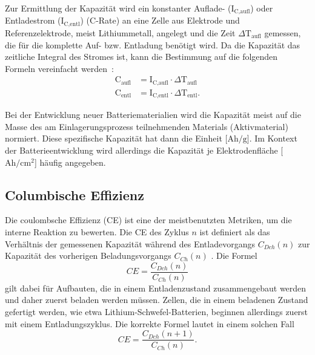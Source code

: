 Zur Ermittlung der Kapazität wird ein konstanter Auflade- ($\text{I}_\text{C,aufl}$) oder Entladestrom ($\text{I}_\text{C,entl}$) (C-Rate) an eine Zelle aus Elektrode und Referenzelektrode, meist Lithiummetall, angelegt und die Zeit $\Delta \text{T}_\text{aufl}$ gemessen, die für die komplette Auf- bzw. Entladung benötigt wird. Da die Kapazität das zeitliche Integral des Stromes ist, kann die Bestimmung auf die folgenden Formeln vereinfacht werden~\cite{Newman2021}:
\begin{align}
	\text{C}_{\text{aufl}} &= \text{I}_\text{C,aufl} \cdot \Delta \text{T}_\text{aufl}\\
	\text{C}_{\text{entl}} &= \text{I}_\text{C,entl} \cdot \Delta \text{T}_\text{entl}.
\end{align}


Bei der Entwicklung neuer Batteriematerialien wird die Kapazität meist auf die Masse des am Einlagerungsprozess teilnehmenden Materials (Aktivmaterial) normiert. Diese spezifische Kapazität hat dann die Einheit [$\si{\A \hour \per \g}$]. Im Kontext der Batterieentwicklung wird allerdings die Kapazität je Elektrodenfläche [$\si{\A \hour \per \cm\squared}$] häufig angegeben.


\subsection{Columbische Effizienz}
Die coulombsche Effizienz (CE) ist eine der meistbenutzten Metriken, um die interne Reaktion zu bewerten. Die CE des Zyklus \( n \) ist definiert als das Verhältnis der gemessenen Kapazität während des Entladevorgangs \( C_{Dch}(n) \) zur Kapazität des vorherigen Beladungsvorgangs \( C_{Ch}(n) \) \cite{Tornheim2020}.
Die Formel
\begin{equation}
CE = \frac{C_{Dch}(n)}{C_{Ch}(n)}
\end{equation}
gilt dabei für Aufbauten, die in einem Entladenzustand zusammengebaut werden und daher zuerst beladen werden müssen. Zellen, die in einem beladenen Zustand gefertigt werden, wie etwa Lithium-Schwefel-Batterien, beginnen allerdings zuerst mit einem Entladungszyklus. Die korrekte Formel lautet in einem solchen Fall
\begin{equation}
    CE = \frac{C_{Dch}(n+1)}{C_{Ch}(n)}.
\end{equation}

